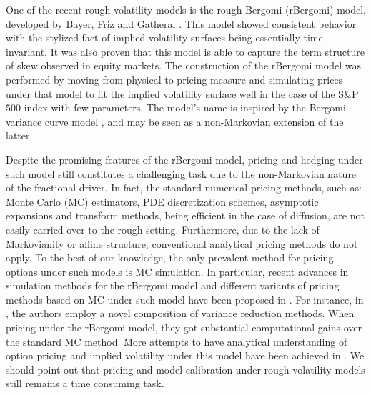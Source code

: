  
 One of the recent rough volatility models is the rough Bergomi (rBergomi) model, developed by Bayer, Friz and Gatheral \cite{bayer2016pricing}. This model showed   consistent behavior with the stylized fact of implied volatility surfaces being essentially time-invariant. It was also proven that this model 
 is able to capture the term structure of skew observed in equity markets. The construction of the rBergomi model was performed by  moving from  physical to pricing measure and simulating prices under that model to fit  the implied volatility surface well in the case of the S\&P $500$ index with few parameters. The model's name is inspired by the Bergomi variance curve model \cite{bergomi2005smile}, and may be seen as a non-Markovian extension of the latter.
 
Despite the promising features of the rBergomi model, pricing  and hedging under such model still constitutes a challenging task due  to the non-Markovian nature of the fractional driver. In fact, the standard numerical pricing methods, such as: Monte Carlo (MC) estimators, PDE discretization schemes, asymptotic expansions and transform
methods, being efficient in the case of diffusion, are not easily  carried over to the rough setting. Furthermore,  due to the lack of Markovianity or affine structure, conventional analytical pricing methods  do not apply. To the best of our knowledge, the only prevalent method for pricing  options under such models is MC simulation. In particular,  recent advances in simulation methods for the rBergomi model and different variants of pricing methods based on  MC under such model   have been proposed in \cite{bayer2016pricing,bayer2017regularity,mccrickerd2017turbocharging,bennedsen2017hybrid,jacquier2018vix}.  For instance, in \cite{mccrickerd2017turbocharging}, the authors employ a novel composition of variance reduction methods. When pricing under the rBergomi model, they got  substantial computational gains  over the standard MC method. More attempts to have  analytical understanding of option pricing and implied volatility under this model have been achieved  in \cite{jacquier2017pathwise,bayer2017short,forde2017asymptotics}. We should point out that pricing and model calibration under rough volatility models still remains a time consuming task.


